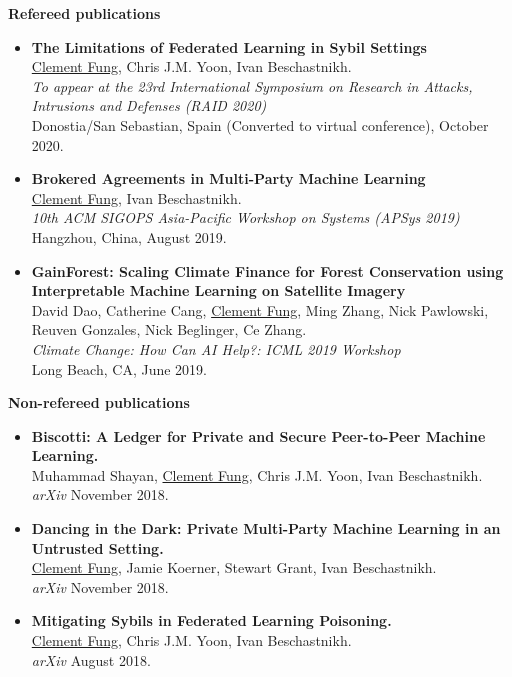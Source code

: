 \documentclass[10pt]{res} %
\begin{document}
\textbf{Refereed publications}
\begin{itemize}
\item \textbf{The Limitations of Federated Learning in Sybil Settings} \\
\underline{Clement Fung}, Chris J.M. Yoon, Ivan Beschastnikh. \\
\emph{To appear at the 23rd International Symposium on Research in Attacks, Intrusions and Defenses (RAID 2020)} \\
Donostia/San Sebastian, Spain (Converted to virtual conference), October 2020.

\item \textbf{Brokered Agreements in Multi-Party Machine Learning} \\
\underline{Clement Fung}, Ivan Beschastnikh. \\
\emph{10th ACM SIGOPS Asia-Pacific Workshop on Systems (APSys 2019)} \\
Hangzhou, China, August 2019.

\item \textbf{GainForest: Scaling Climate Finance for Forest Conservation using Interpretable Machine Learning
    on Satellite Imagery} \\
David Dao, Catherine Cang, \underline{Clement Fung}, Ming Zhang, Nick Pawlowski,
    Reuven Gonzales, Nick Beglinger, Ce Zhang. \\
\emph{Climate Change: How Can AI Help?: ICML 2019 Workshop} \\
Long Beach, CA, June 2019.
\end{itemize}

\textbf{Non-refereed publications} 
\begin{itemize}
\item \textbf{Biscotti: A Ledger for Private and Secure Peer-to-Peer Machine Learning.} \\
Muhammad Shayan, \underline{Clement Fung}, Chris J.M. Yoon, Ivan Beschastnikh. \\ 
\emph{arXiv} November 2018.
%
\item \textbf{Dancing in the Dark: Private Multi-Party Machine Learning in an
Untrusted Setting.} \\
\underline{Clement Fung}, Jamie Koerner, Stewart Grant, Ivan Beschastnikh. \\ 
\emph{arXiv} November 2018.
%
\item \textbf{Mitigating Sybils in Federated Learning Poisoning.} \\ 
\underline{Clement Fung}, Chris J.M. Yoon, Ivan Beschastnikh. \\
\emph{arXiv} August 2018.
\end{itemize}
\end{document}
